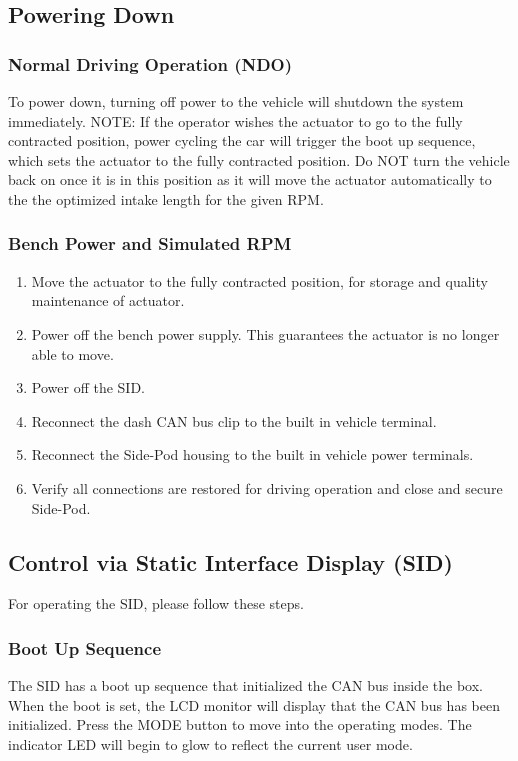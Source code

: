 \documentclass{article}
\begin{document}
\subsection{Powering Down}
\subsubsection{Normal Driving Operation (NDO)}
To power down, turning off power to the vehicle will shutdown the system immediately. 
\newline \newline 
NOTE: If the operator wishes the actuator to go to the fully contracted position, power cycling the car will trigger the boot up sequence, which sets the actuator to the fully contracted position. Do NOT turn the vehicle back on once it is in this position as it will move the actuator automatically to the the optimized intake length for the given RPM.

\subsubsection{Bench Power and Simulated RPM}
\begin{enumerate}
    \item Move the actuator to the fully contracted position, for storage and quality maintenance of actuator.
    \item Power off the bench power supply. This guarantees the actuator is no longer able to move.
    \item Power off the SID.
    \item Reconnect the dash CAN bus clip to the built in vehicle terminal.
    \item Reconnect the Side-Pod housing to the built in vehicle power terminals.
    \item Verify all connections are restored for driving operation and close and secure Side-Pod.
\end{enumerate}

\subsection{Control via Static Interface Display (SID)}
For operating the SID, please follow these steps.
\subsubsection{Boot Up Sequence}
The SID has a boot up sequence that initialized the CAN bus inside the box. When the boot is set, the LCD monitor will display that the CAN bus has been initialized. Press the MODE button to move into the operating modes. The indicator LED will begin to glow to reflect the current user mode.
\end{document}
